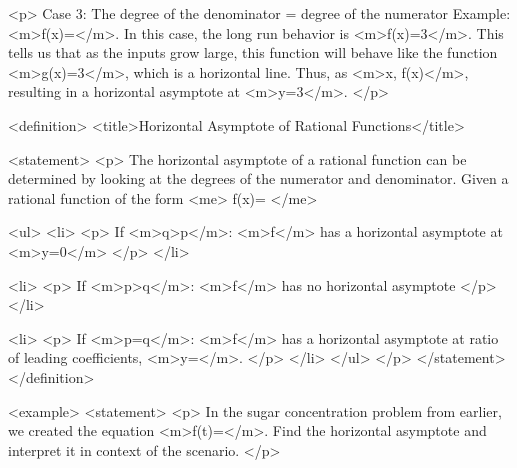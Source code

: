         <p>
            Case 3: The degree of the denominator = degree of the numerator Example: <m>f(x)=</m>.
            In this case, the long run behavior is <m>f(x)\approx {}=3</m>.
            This tells us that as the inputs grow large, this function will behave like the function <m>g(x)=3</m>, which is a horizontal line.
            Thus, as <m>x\to \pm \infty, f(x)</m>, resulting in a horizontal asymptote at <m>y=3</m>.
        </p>

        <definition>
            <title>Horizontal Asymptote of Rational Functions</title>

            <statement>
                <p>
                    The horizontal asymptote of a rational function can be determined by looking at the degrees of the numerator and denominator.
                    Given a rational function of the form
                    <me>
                        f(x)=
                    </me>

                    <ul>
                        <li>
                            <p>
                                If <m>q>p</m>: <m>f</m> has a horizontal asymptote at <m>y=0</m>
                            </p>
                        </li>

                        <li>
                            <p>
                                If <m>p>q</m>: <m>f</m> has no horizontal asymptote
                            </p>
                        </li>

                        <li>
                            <p>
                                If <m>p=q</m>: <m>f</m> has a horizontal asymptote at ratio of leading coefficients, <m>y=</m>.
                            </p>
                        </li>
                    </ul>
                </p>
            </statement>
        </definition>

        <example>
            <statement>
                <p>
                    In the sugar concentration problem from earlier, we created the equation <m>f(t)=</m>.
                    Find the horizontal asymptote and interpret it in context of the scenario.
                </p>


